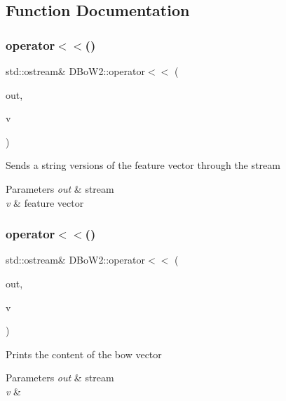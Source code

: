 \subsection{Function Documentation}
\mbox{\label{namespaceDBoW2_ac65e2bfb945a77c5294d0300a4fed49c}} 
\subsubsection{\texorpdfstring{operator$<$$<$()}{operator<<()}\hspace{0.1cm}{\footnotesize\ttfamily [1/4]}}
{\footnotesize\ttfamily std\+::ostream\& D\+Bo\+W2\+::operator$<$$<$ (\begin{DoxyParamCaption}\item[{std\+::ostream \&}]{out,  }\item[{const \hyperlink{classDBoW2_1_1FeatureVector}{Feature\+Vector} \&}]{v }\end{DoxyParamCaption})}

Sends a string versions of the feature vector through the stream 
\begin{DoxyParams}{Parameters}
{\em out} & stream \\
\hline
{\em v} & feature vector \\
\hline
\end{DoxyParams}
\mbox{\label{namespaceDBoW2_a06d2058b1bde1cdc49f277fec62073e2}} 
\subsubsection{\texorpdfstring{operator$<$$<$()}{operator<<()}\hspace{0.1cm}{\footnotesize\ttfamily [2/4]}}
{\footnotesize\ttfamily std\+::ostream\& D\+Bo\+W2\+::operator$<$$<$ (\begin{DoxyParamCaption}\item[{std\+::ostream \&}]{out,  }\item[{const \hyperlink{classDBoW2_1_1BowVector}{Bow\+Vector} \&}]{v }\end{DoxyParamCaption})}

Prints the content of the bow vector 
\begin{DoxyParams}{Parameters}
{\em out} & stream \\
\hline
{\em v} & \\
\hline
\end{DoxyParams}
\mbox{\label{namespaceDBoW2_ac1f00f5484f61d6ab3b1f650955210d8}} 
